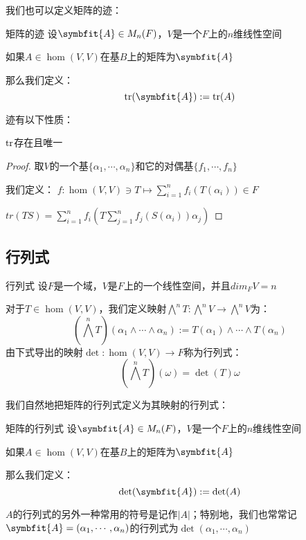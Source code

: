 \documentclass[12pt, a4paper, oneside, UTF8]{ctexbook}
\begin{document}
			我们也可以定义矩阵的迹：
			\begin{defn}{矩阵的迹}{}
				设$\symbfit{A} \in M_n(F)$，$V$是一个$F$上的$n$维线性空间

				如果$A \in \hom(V,V)$在基$B$上的矩阵为$\symbfit{A}$

				那么我们定义：
				\begin{equation}
					\tr(\symbfit{A}):=\tr(A)
				\end{equation}
			\end{defn}

			迹有以下性质：
			\begin{para}{0}
				\point{}
					\begin{proposition}
						$\operatorname{tr}$存在且唯一
					\end{proposition}
					\begin{proof}
						取$V$的一个基$\{\alpha_1,\cdots,\alpha_n\}$和它的对偶基$\{f_1,\cdots,f_n\}$

						我们定义：
						$f:\hom(V,V) \ni T \mapsto \sum\limits_{i=1}^{n} f_i\left(T(\alpha_i)\right) \in F$
					
						$tr(TS)=\sum\limits_{i=1}^{n} f_i\left(T\sum\limits_{j=1}^{n}f_j(S(\alpha_i))\alpha_j\right)$
					
					\end{proof}
			\end{para}
		\subsection{行列式}
			\begin{defn}{行列式}{}
				设$F$是一个域，$V$是$F$上的一个线性空间，并且$dim_F V = n$

				对于$T\in\hom(V,V)$，我们定义映射$\bigwedge^n T:\bigwedge^n V \to \bigwedge^n V$为：
				\begin{equation}
					\left(\bigwedge^n T\right)(\alpha_1 \wedge \cdots \wedge \alpha_n):= T(\alpha_1) \wedge \cdots \wedge T(\alpha_n)
				\end{equation}
				由下式导出的映射$\det: \hom(V,V) \rightarrow F$称为行列式：
				\begin{equation}
					\left(\bigwedge^n T\right)(\omega )=\det(T)\omega 
				\end{equation}
			\end{defn}
			我们自然地把矩阵的行列式定义为其映射的行列式：
			\begin{defn}{矩阵的行列式}{}
				设$\symbfit{A} \in M_n(F)$，$V$是一个$F$上的$n$维线性空间

				如果$A \in \hom(V,V)$在基$B$上的矩阵为$\symbfit{A}$

				那么我们定义：
				\begin{equation}
					\det(\symbfit{A}):=\det(A)
				\end{equation}
			\end{defn}
			$A$的行列式的另外一种常用的符号是记作$|A|$；特别地，我们也常常记$\symbfit{A}=(\alpha_1,\cdots,\alpha_n)$的行列式为$\det(\alpha_1,\cdots,\alpha_n)$
			
\end{document}
